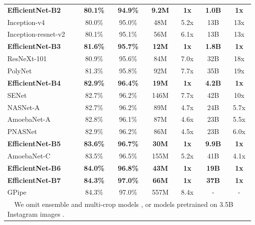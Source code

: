 \documentclass{article}
\begin{document}
\begin{table}
{\begin{tabular}{l|cc||cc||cc}
        \midrule
        \bf EfficientNet-B2  & \bf 80.1\% & \bf 94.9\% & \bf 9.2M  & \bf 1x & \bf 1.0B & \bf  1x \\
        Inception-v4 \cite{inceptionv417} & 80.0\% & 95.0\% & 48M & 5.2x & 13B & 13x \\
        Inception-resnet-v2  \cite{inceptionv417} & 80.1\% & 95.1\% & 56M & 6.1x & 13B & 13x \\

         \midrule
		\bf EfficientNet-B3  & \bf 81.6\% & \bf 95.7\% & \bf 12M  & \bf 1x & \bf 1.8B & \bf  1x \\
		ResNeXt-101 \cite{resnext17} & 80.9\% & 95.6\% & 84M & 7.0x & 32B & 18x \\
		PolyNet \cite{polynet17} & 81.3\%  & 95.8\% & 92M & 7.7x & 35B & 19x \\

		\midrule
		\bf EfficientNet-B4  & \bf 82.9\% & \bf 96.4\% & \bf 19M  & \bf 1x & \bf 4.2B & \bf  1x \\
		SENet \cite{senet18} & 82.7\% & 96.2\% & 146M & 7.7x & 42B & 10x \\
		 NASNet-A \cite{nas_imagenet18} & 82.7\% & 96.2\% & 89M & 4.7x & 24B & 5.7x \\
		 AmoebaNet-A \cite{amoebanets18} & 82.8\% & 96.1\% & 87M & 4.6x & 23B & 5.5x \\
		 PNASNet \cite{pnas18} & 82.9\% & 96.2\% & 86M & 4.5x & 23B & 6.0x \\

		\midrule
		\bf EfficientNet-B5  & \bf 83.6\% & \bf 96.7\% & \bf 30M  & \bf 1x & \bf 9.9B & \bf  1x \\
		 AmoebaNet-C  \cite{autoaugment18} &  83.5\%  & 96.5\% & 155M & 5.2x & 41B & 4.1x \\

		\midrule
		 \bf EfficientNet-B6  & \bf 84.0\% & \bf 96.8\% & \bf 43M  & \bf 1x & \bf 19B & \bf  1x \\
		\midrule
		\bf EfficientNet-B7  & \bf 84.3\% & \bf 97.0\% & \bf 66M  & \bf 1x & \bf 37B & \bf  1x \\
		GPipe \cite{gpipe18}  & 84.3\% & 97.0\% & 557M & 8.4x & - & - \\
        \bottomrule[0.15em]
        \multicolumn{7}{l}{~~We omit ensemble and multi-crop models \cite{senet18}, or models pretrained on 3.5B Instagram images \cite{imagenetinstagram18}.~~}
        \end{tabular}
    }
    \label{tab:imagenet}
\end{table}
 
\end{document}
